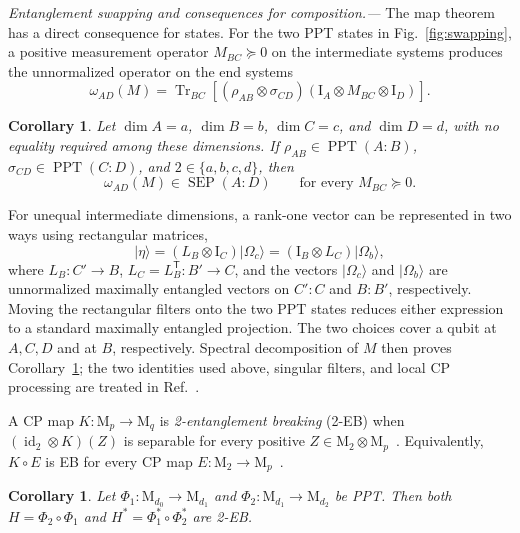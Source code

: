 \documentclass[aps,prl,reprint,superscriptaddress,nofootinbib]{revtex4-2}
\newcommand{\M}{\mathrm{M}}
\newcommand{\I}{\mathrm{I}}
\newcommand{\id}{\operatorname{id}}
\newcommand{\Tr}{\operatorname{Tr}}
\newcommand{\PPT}{\operatorname{PPT}}
\newcommand{\SEP}{\operatorname{SEP}}
\newtheorem{corollary}[theorem]{Corollary}
\begin{document}
\textit{Entanglement swapping and consequences for composition.---}
The map theorem has a direct consequence for states.  For the two PPT states
in Fig.~\ref{fig:swapping}, a positive measurement
operator $M_{BC}\succeq0$ on the intermediate systems produces the
unnormalized operator on the end systems
\begin{equation}
\omega_{AD}(M)=\Tr_{BC}\!\left[(\rho_{AB}\otimes\sigma_{CD})
 (\I_A\otimes M_{BC}\otimes\I_D)\right].
\label{eq:swapping}
\end{equation}

\begin{corollary}
\label{cor:swapping}
Let $\dim A=a$, $\dim B=b$, $\dim C=c$, and $\dim D=d$, with no
equality required among these dimensions.  If
$\rho_{AB}\in\PPT(A:B)$, $\sigma_{CD}\in\PPT(C:D)$, and
$2\in\{a,b,c,d\}$, then
\begin{equation}
 \omega_{AD}(M)\in\SEP(A:D)\qquad\text{for every }M_{BC}\succeq0.
\label{eq:selective}
\end{equation}
\end{corollary}

For unequal intermediate dimensions, a rank-one vector can be represented
in two ways using rectangular matrices,
\begin{equation}
 |\eta\rangle=(L_B\otimes\I_C)|\Omega_c\rangle
 =\left(\I_B\otimes L_C\right)|\Omega_b\rangle,
\label{eq:tworepresentations}
\end{equation}
where $L_B:C'\to B$, $L_C=L_B^{\mathsf T}:B'\to C$, and the vectors
$|\Omega_c\rangle$ and $|\Omega_b\rangle$ are unnormalized maximally
entangled vectors on $C'{:}C$ and $B{:}B'$, respectively.  Moving the
rectangular filters onto the two PPT states reduces either expression to a
standard maximally entangled projection.  The two choices cover a qubit at
$A,C,D$ and at $B$, respectively.  Spectral decomposition of $M$ then proves
Corollary~\ref{cor:swapping}; the two identities used above, singular filters,
and local CP processing are treated in Ref.~\cite{Supplement}.

A CP map $K:\M_p\to\M_q$ is \emph{2-entanglement breaking} (2-EB) when
$(\id_2\otimes K)(Z)$ is separable for every positive
$Z\in\M_2\otimes\M_p$~\cite[Definition~II.2]{Christandl2019}.
Equivalently, $K\circ E$ is EB for every CP map
$E:\M_2\to\M_p$~\cite[Theorem~3.5]{Devendra2023}.

\begin{corollary}
\label{cor:twoeb}
Let $\Phi_1:\M_{d_0}\to\M_{d_1}$ and
$\Phi_2:\M_{d_1}\to\M_{d_2}$ be PPT.  Then both
$H=\Phi_2\circ\Phi_1$ and $H^*=\Phi_1^*\circ\Phi_2^*$ are 2-EB.
\end{corollary}
\end{document}
